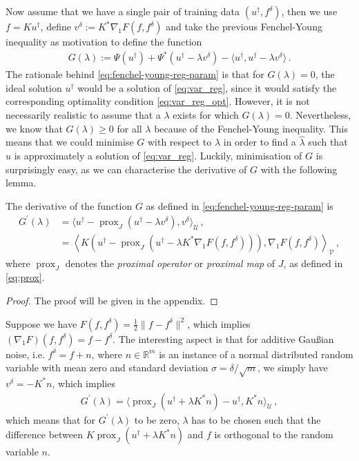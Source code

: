 Now assume that we have a single pair of training data $(u^\dagger, f^\delta)$, then we use $f = K u^\dagger$, define $v^\delta := K^* \nabla_1 F(f, f^\delta)$ and take the previous Fenchel-Young inequality as motivation to define the function
\begin{align}
    G(\lambda) := \Psi(u^\dagger) + \Psi^*(u^\dagger - \lambda v^\delta) - \langle u^\dagger, u^\dagger - \lambda v^\delta \rangle \, .\label{eq:fenchel-young-reg-param}
\end{align}
The rationale behind \eqref{eq:fenchel-young-reg-param} is that for $G(\lambda) = 0$, the ideal solution $u^\dagger$ would be a solution of \eqref{eq:var_reg}, since it would satisfy the corresponding optimality condition \eqref{eq:var_reg_opt}. However, it is not necessarily realistic to assume that a $\lambda$ exists for which $G(\lambda) = 0$. Nevertheless, we know that $G(\lambda) \geq 0$ for all $\lambda$ because of the Fenchel-Young inequality. This means that we could minimise $G$ with respect to $\lambda$ in order to find a $\hat{\lambda}$ such that $u$ is approximately a solution of \eqref{eq:var_reg}. Luckily, minimisation of $G$ is surprisingly easy, as we can characterise the derivative of $G$ with the following lemma.
\begin{lem}\normalfont
    The derivative of the function $G$ as defined in \eqref{eq:fenchel-young-reg-param} is
    \begin{align}
        G^\prime(\lambda) &= \langle u^\dagger - \operatorname{prox}_J(u^\dagger - \lambda v^\delta), v^\delta \rangle_{\mathcal{U}} \, , \label{eq:fenchel-young-loss-derivative}\\
        &= \left\langle K \left(u^\dagger - \operatorname{prox}_J\left(u^\dagger - \lambda K^* \nabla_1 F(f, f^\delta)\right)\right), \nabla_1 F(f, f^\delta) \right\rangle_{\mathcal{V}} \, ,\nonumber
    \end{align}
    where $\operatorname{prox}_J$ denotes the \emph{proximal operator} or \emph{proximal map} of $J$, as defined in \eqref{eq:prox}.
    
\begin{proof}
    The proof will be given in the appendix.
\end{proof}
\end{lem}
\begin{exm}
    Suppose we have $F(f, f^\delta) = \frac12 \| f - f^\delta \|^2$, which implies $(\nabla_1 F)(f, f^\delta) = f - f^\delta$. The interesting aspect is that for additive Gau\ss ian noise, i.e. $f^\delta = f + n$, where $n \in \mathbb{R}^m$ is an instance of a normal distributed random variable with mean zero and standard deviation $\sigma = \delta/\sqrt{m}$, we simply have $v^\delta = - K^* n$, which implies
    \begin{align*}
        G^\prime(\lambda) = \langle \operatorname{prox}_J(u^\dagger + \lambda K^* n ) - u^\dagger, K^* n \rangle_{\mathcal{U}} \, ,
    \end{align*}
    which means that for $G^\prime(\lambda)$ to be zero, $\lambda$ has to be chosen such that the difference between $K \operatorname{prox}_J(u^\dagger + \lambda K^* n )$ and $f$ is orthogonal to the random variable $n$.
\end{exm}
